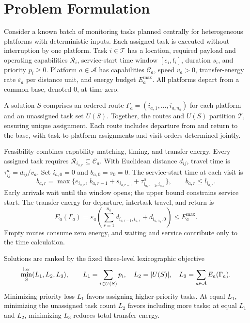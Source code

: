 \section{Problem Formulation}
\label{sec:problem}
Consider a known batch of monitoring tasks planned centrally for heterogeneous platforms with deterministic inputs. Each assigned task is executed without interruption by one platform. Task $i\in\mathcal T$ has a location, required payload and operating capabilities $\mathcal R_i$, service-start time window $[e_i,l_i]$, duration $s_i$, and priority $p_i\geq0$. Platform $a\in\mathcal A$ has capabilities $\mathcal C_a$, speed $v_a>0$, transfer-energy rate $\varepsilon_a$ per distance unit, and energy budget $E_a^{\max}$. All platforms depart from a common base, denoted $0$, at time zero.

A solution $S$ comprises an ordered route $\Gamma_a=(i_{a,1},\ldots,i_{a,n_a})$ for each platform and an unassigned task set $U(S)$. Together, the routes and $U(S)$ partition $\mathcal T$, ensuring unique assignment. Each route includes departure from and return to the base, with task-to-platform assignments and visit orders determined jointly.

Feasibility combines capability matching, timing, and transfer energy. Every assigned task requires $\mathcal R_{i_{a,r}}\subseteq\mathcal C_a$. With Euclidean distance $d_{ij}$, travel time is $\tau^a_{ij}=d_{ij}/v_a$. Set $i_{a,0}=0$ and $b_{a,0}=s_0=0$. The service-start time at each visit is
\begin{equation}
 b_{a,r}=\max\{e_{i_{a,r}},\,b_{a,r-1}+s_{i_{a,r-1}}+\tau^a_{i_{a,r-1},i_{a,r}}\},
 \qquad b_{a,r}\leq l_{i_{a,r}}.
 \label{eq:time}
\end{equation}
Early arrivals wait until the window opens; the upper bound constrains service start. The transfer energy for departure, intertask travel, and return is
\begin{equation}
 E_a(\Gamma_a)=\varepsilon_a\left(\sum_{r=1}^{n_a}d_{i_{a,r-1},i_{a,r}}+d_{i_{a,n_a},0}\right)\leq E_a^{\max}.
 \label{eq:energy}
\end{equation}
Empty routes consume zero energy, and waiting and service contribute only to the time calculation.

Solutions are ranked by the fixed three-level lexicographic objective
\begin{equation}
 \min_S^{\mathop{\mathrm{lex}}}(L_1,L_2,L_3),\qquad
 L_1=\sum_{i\in U(S)}p_i,\quad L_2=|U(S)|,\quad L_3=\sum_{a\in\mathcal A}E_a(\Gamma_a).
 \label{eq:objective}
\end{equation}
Minimizing priority loss $L_1$ favors assigning higher-priority tasks. At equal $L_1$, minimizing the unassigned task count $L_2$ favors including more tasks; at equal $L_1$ and $L_2$, minimizing $L_3$ reduces total transfer energy.
